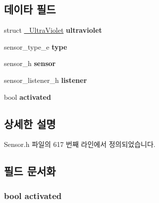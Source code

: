 \subsection*{데이타 필드}
\begin{DoxyCompactItemize}
\item 
\hypertarget{struct__UltraVioletExtend_a5ecfbeb3a1030d60f8478b26f0ea7fb0}{struct \hyperlink{struct__UltraViolet}{\-\_\-\-Ultra\-Violet} {\bfseries ultraviolet}}\label{struct__UltraVioletExtend_a5ecfbeb3a1030d60f8478b26f0ea7fb0}

\item 
\hypertarget{struct__UltraVioletExtend_abffb09766da2fc510a79bb51f82a36e1}{sensor\-\_\-type\-\_\-e {\bfseries type}}\label{struct__UltraVioletExtend_abffb09766da2fc510a79bb51f82a36e1}

\item 
\hypertarget{struct__UltraVioletExtend_a5bae9b7801bc3808411925cde81d3f26}{sensor\-\_\-h {\bfseries sensor}}\label{struct__UltraVioletExtend_a5bae9b7801bc3808411925cde81d3f26}

\item 
\hypertarget{struct__UltraVioletExtend_aa977dfb866b24fd7d9a20a9a01b2fd1f}{sensor\-\_\-listener\-\_\-h {\bfseries listener}}\label{struct__UltraVioletExtend_aa977dfb866b24fd7d9a20a9a01b2fd1f}

\item 
\hypertarget{struct__UltraVioletExtend_a73e9fa0c3543560192f38a8ab6a78c47}{bool {\bfseries activated}}\label{struct__UltraVioletExtend_a73e9fa0c3543560192f38a8ab6a78c47}

\end{DoxyCompactItemize}


\subsection{상세한 설명}


Sensor.\-h 파일의 617 번째 라인에서 정의되었습니다.



\subsection{필드 문서화}
\hypertarget{struct__UltraVioletExtend_a73e9fa0c3543560192f38a8ab6a78c47}{
\subsubsection[{activated}]{\setlength{\rightskip}{0pt plus 5cm}bool activated}}\label{struct__UltraVioletExtend_a73e9fa0c3543560192f38a8ab6a78c47}


